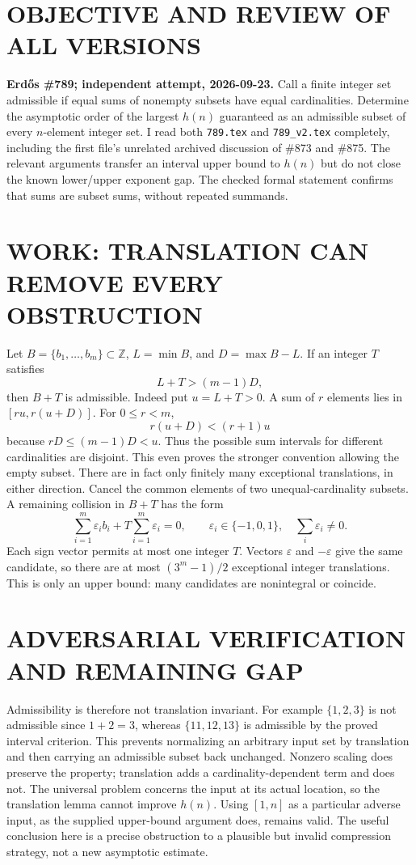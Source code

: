 \section{OBJECTIVE AND REVIEW OF ALL VERSIONS}
\textbf{Erd\H{o}s \#789; independent attempt, 2026-09-23.}
Call a finite integer set admissible if equal sums of nonempty subsets have equal cardinalities. Determine the asymptotic order of the largest $h(n)$ guaranteed as an admissible subset of every $n$-element integer set. I read both \texttt{789.tex} and \texttt{789\_v2.tex} completely, including the first file's unrelated archived discussion of \#873 and \#875. The relevant arguments transfer an interval upper bound to $h(n)$ but do not close the known lower/upper exponent gap. The checked formal statement confirms that sums are subset sums, without repeated summands.
\section{WORK: TRANSLATION CAN REMOVE EVERY OBSTRUCTION}
Let $B=\{b_1,\ldots,b_m\}\subset\mathbb Z$, $L=\min B$, and $D=\max B-L$. If an integer $T$ satisfies
\[
L+T>(m-1)D,
\]
then $B+T$ is admissible. Indeed put $u=L+T>0$. A sum of $r$ elements lies in $[ru,r(u+D)]$. For $0\le r<m$,
\[
r(u+D)<(r+1)u
\]
because $rD\le(m-1)D<u$. Thus the possible sum intervals for different cardinalities are disjoint. This even proves the stronger convention allowing the empty subset.
There are in fact only finitely many exceptional translations, in either direction. Cancel the common elements of two unequal-cardinality subsets. A remaining collision in $B+T$ has the form
\[
\sum_{i=1}^m\varepsilon_i b_i+T\sum_{i=1}^m\varepsilon_i=0,
\qquad \varepsilon_i\in\{-1,0,1\},\quad\sum_i\varepsilon_i\ne0.
\]
Each sign vector permits at most one integer $T$. Vectors $\varepsilon$ and $-\varepsilon$ give the same candidate, so there are at most $(3^m-1)/2$ exceptional integer translations. This is only an upper bound: many candidates are nonintegral or coincide.
\section{ADVERSARIAL VERIFICATION AND REMAINING GAP}
Admissibility is therefore not translation invariant. For example $\{1,2,3\}$ is not admissible since $1+2=3$, whereas $\{11,12,13\}$ is admissible by the proved interval criterion. This prevents normalizing an arbitrary input set by translation and then carrying an admissible subset back unchanged. Nonzero scaling does preserve the property; translation adds a cardinality-dependent term and does not.
The universal problem concerns the input at its actual location, so the translation lemma cannot improve $h(n)$. Using $[1,n]$ as a particular adverse input, as the supplied upper-bound argument does, remains valid. The useful conclusion here is a precise obstruction to a plausible but invalid compression strategy, not a new asymptotic estimate.

